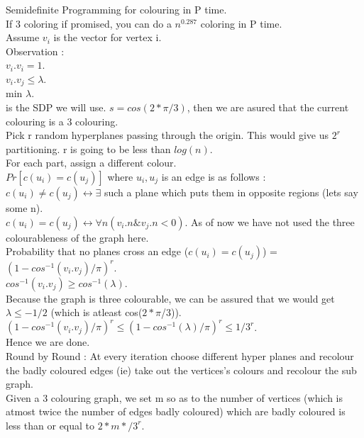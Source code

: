 \documentclass[solution,addpoints,12pt]{exam}
\begin{document}
Semidefinite Programming for colouring in P time.\\
If 3 coloring if promised, you can do a $n^{0.287}$ coloring in P time.\\
Assume $v_i$ is the vector for vertex i.\\
Observation :\\
$v_i.v_i = 1$.\\
$v_i.v_j \le \lambda$.\\
min $\lambda$.\\
is the SDP we will use. $s = cos(2*\pi/3)$, then we are asured that
the current colouring is a 3 colouring.\\
Pick r random hyperplanes passing through the origin. This
would give us $2^r$ partitioning. r is going to be less than $log(n)$.\\
For each part, assign a different colour.\\
$Pr[c(u_i) = c(u_j)]$ where $u_i, u_j$ is an edge is as follows :\\
$c(u_i) \ne c(u_j) \leftrightarrow \exists$ such a plane which
puts them in opposite regions (lets say some n).\\
$c(u_i) = c(u_j) \leftrightarrow \forall n (v_i.n \& v_j.n < 0)$.
As of now we have not used the three colourableness of the
graph here.\\
Probability that no planes cross an edge ($c(u_i) = c(u_j)$) =
$(1 - {cos}^{-1}(v_i.v_j)/\pi)^r$.\\
${cos}^{-1}(v_i.v_j) \ge {cos}^{-1}(\lambda)$.\\
Because the graph is three colourable, we can be assured that we would
get $\lambda \le -1/2$ (which is atleast cos($2*\pi$/3)).\\
$(1 - {cos}^{-1}(v_i.v_j)/\pi)^r \le (1 - {cos}^{-1}(\lambda)/\pi)^r \le 1/3^r$.\\
Hence we are done.\\

Round by Round : At every iteration choose different hyper planes
and recolour the badly coloured edges (ie) take
out the vertices's colours and recolour the
sub graph.\\
Given a 3 colouring graph, we set m so as to the number
of vertices (which is atmost twice the number of edges badly coloured)
which are badly coloured is less than or equal to $2*m*/3^r$.\\
\end{document}
